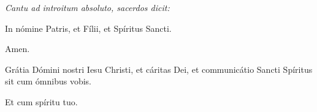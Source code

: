 \textit{Cantu ad introitum absoluto, sacerdos dicit:}

In nómine Patris, et Fílii, \grecross{} et Spíritus Sancti.

\Rbardot{} Amen.

\Vbardot{} Grátia Dómini nostri Iesu Christi, et cáritas Dei, et communicátio Sancti
Spíritus sit cum ómnibus vobis.

\Rbardot{} Et cum spíritu tuo.
